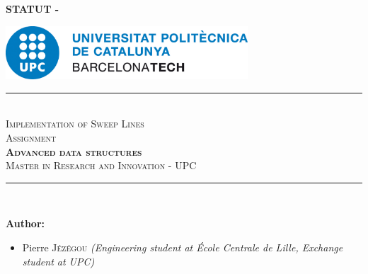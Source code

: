 \pagestyle{plain}
\pagecolor{white}

\begin{center}
    \color{red!50!white}
    \textbf{\huge{STATUT - \documentStatus}}
\end{center}

\vfill


\color{black}
\begin{center}
    \includegraphics[height=2cm]{images/logos/upc_logo.jpeg} \\
    \vfill
    \rule{\linewidth}{0.5mm} \\[1cm]
    {\Huge \textsc{\textcolor{fib_red}{Implementation of Sweep Lines}}}\\[1cm]
    {\Large \textsc{Assignment}}\\[0.4cm]
    {\huge \textsc{\textbf{Advanced data structures}}}\\[1cm]
    {\Large \textsc{Master in Research and Innovation - UPC}}\\[0.4cm]
    \rule{\linewidth}{0.5mm} \\[1.5cm]
\end{center}

\vfill

\textbf{Author:}
\begin{itemize}
\item Pierre \textsc{Jézégou}\newline
\textit{(Engineering student at École Centrale de Lille, Exchange student at UPC)}
\end{itemize}

\newpage
\color{black}
\pagecolor{white}
\pagestyle{fancy}